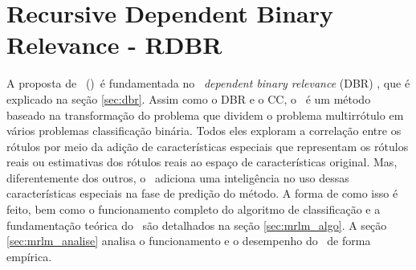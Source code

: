 

\chapter{Recursive Dependent Binary Relevance - RDBR}
A proposta de \MRLM~(\MRLMa)~é fundamentada no \MML~\textit{dependent binary relevance} (DBR) \cite{dbr2014}, que é explicado
na seção \ref{sec:dbr}. Assim como o DBR e o CC, o \MRLMa~é um método baseado na transformação do problema que dividem o problema
multirrótulo em vários problemas classificação binária. Todos eles exploram a correlação entre os rótulos por meio da adição de
características especiais que representam os rótulos reais ou estimativas dos rótulos reais ao espaço de características original. 
Mas, diferentemente dos outros, o \MRLMa~adiciona uma inteligência no uso dessas características especiais na fase de predição do método.
A forma de como isso é feito, bem como o funcionamento completo do algoritmo de classificação e a fundamentação teórica
do \MRLMa~são detalhados na seção \ref{sec:mrlm_algo}. 
A seção \ref{sec:mrlm_analise} analisa o funcionamento e o desempenho do \MRLMa~de forma empírica.


